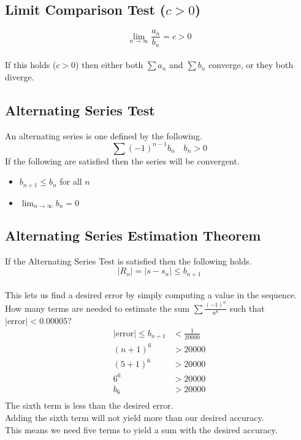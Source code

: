 \documentclass[12pt]{article}
\begin{document}
\subsection{Limit Comparison Test ($c > 0$)}

\begin{displaymath}
\lim_{n\to\infty} \frac{a_n}{b_n} = c > 0
\end{displaymath}
\\
If this holds ($c > 0$) then either both $\sum a_n$ and $\sum b_n$ converge, or they both diverge.


\subsection{Alternating Series Test}

An alternating series is one defined by the following.\\
\begin{displaymath}
\sum (-1)^{n-1} b_n\quad b_n > 0
\end{displaymath}
If the following are satisfied then the series will be convergent.
\begin{itemize}
\item $b_{n+1} \leq b_n$ for all $n$
\item $\lim_{n\to\infty} b_n = 0$
\end{itemize}


\subsection{Alternating Series Estimation Theorem}

If the Alternating Series Test is satisfied then the following holds.
\\
\begin{displaymath}
\left|R_n\right| = \left|s - s_n\right| \leq b_{n+1}
\end{displaymath}
\\
This lets us find a desired error by simply computing a value in the sequence.
\\
How many terms are needed to estimate the sum $\sum \frac{(-1)^n}{n^6}$ such that $|\text{error}| < 0.00005$?\\
\begin{align*}
\left|\text{error}\right| \leq b_{n+1} &< \frac{1}{20000}\\
(n+1)^6 &> 20000\\
(5+1)^6 &> 20000\\
    6^6 &> 20000\\
    b_6 &> 20000\\
\end{align*}
The sixth term is less than the desired error.\\
Adding the sixth term will not yield more than our desired accuracy.\\
This means we need five terms to yield a sum with the desired accuracy.
\end{document}
